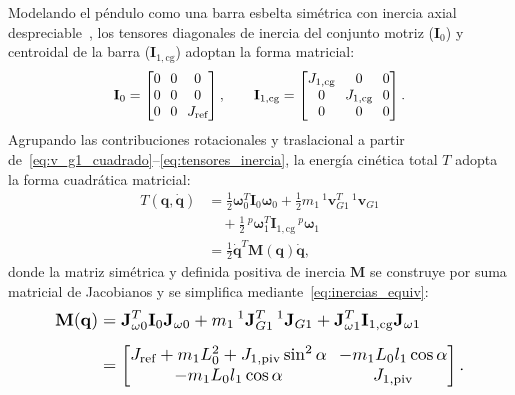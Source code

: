 Modelando el péndulo como una barra esbelta simétrica con inercia axial despreciable~\cite{cazzolato2011}, los tensores diagonales de inercia del conjunto motriz ($\mathbf{I}_0$) y centroidal de la barra ($\mathbf{I}_{1,\text{cg}}$) adoptan la forma matricial:
\begin{equation}
    \setlength{\arraycolsep}{3.5pt}
    \mathbf{I}_0 = \begin{bmatrix} 0 & 0 & 0 \\ 0 & 0 & 0 \\ 0 & 0 & J_{\text{ref}} \end{bmatrix}, \qquad
    \mathbf{I}_{1,\text{cg}} = \begin{bmatrix} J_{1,\text{cg}} & 0 & 0 \\ 0 & J_{1,\text{cg}} & 0 \\ 0 & 0 & 0 \end{bmatrix}.
    \label{eq:tensores_inercia}
\end{equation}
Agrupando las contribuciones rotacionales y traslacional a partir de~\eqref{eq:v_g1_cuadrado}--\eqref{eq:tensores_inercia}, la energía cinética total $T$ adopta la forma cuadrática matricial:
\begin{equation}
    \begin{aligned}
        T(\mathbf{q},\dot{\mathbf{q}}) &= \frac{1}{2}\boldsymbol{\omega}_0^T\mathbf{I}_0\boldsymbol{\omega}_0
        + \frac{1}{2}m_1\,{}^{1}\mathbf{v}_{G1}^T\,{}^{1}\mathbf{v}_{G1} \\
        &\quad + \frac{1}{2}\,{}^{p}\boldsymbol{\omega}_1^T\mathbf{I}_{1,\text{cg}}\,{}^{p}\boldsymbol{\omega}_1 \\[3pt]
        &= \frac{1}{2}\dot{\mathbf{q}}^T\mathbf{M}(\mathbf{q})\dot{\mathbf{q}},
    \end{aligned}
    \label{eq:energia_cinetica}
\end{equation}
donde la matriz simétrica y definida positiva de inercia $\mathbf{M}$ se construye por suma matricial de Jacobianos y se simplifica mediante~\eqref{eq:inercias_equiv}:
\begin{equation}
\resizebox{0.85\columnwidth}{!}{$\displaystyle
    \setlength{\arraycolsep}{3.5pt}
    \begin{aligned}
        \mathbf{M}(\mathbf{q}) &= \mathbf{J}_{\omega 0}^T\mathbf{I}_0\mathbf{J}_{\omega 0}
        + m_1\,{}^{1}\mathbf{J}_{G1}^T\,{}^{1}\mathbf{J}_{G1}
        + \mathbf{J}_{\omega 1}^T\mathbf{I}_{1,\text{cg}}\mathbf{J}_{\omega 1} \\[4pt]
        &= \begin{bmatrix}
            J_{\text{ref}} + m_1 L_0^2 + J_{1,\text{piv}}\sin^2\alpha & -m_1 L_0 l_1\cos\alpha \\
            -m_1 L_0 l_1\cos\alpha & J_{1,\text{piv}}
        \end{bmatrix}.
    \end{aligned}
$}
    \label{eq:matriz_inercia}
\end{equation}
